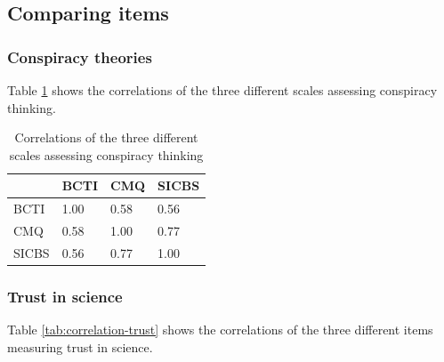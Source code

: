 \documentclass[
  doc,floatsintext]{apa6}
\begin{document}
\subsection{Comparing items}\label{comparing-items}

\subsubsection{Conspiracy theories}\label{conspiracy-theories}

Table \ref{tab:correlation-conspiracy} shows the correlations of the three different scales assessing conspiracy thinking.

\begin{table}[h]

\begin{center}
\begin{threeparttable}

\caption{\label{tab:correlation-conspiracy}Correlations of the three different scales assessing conspiracy thinking}

\begin{tabular}{llll}
\toprule
 & \multicolumn{1}{c}{BCTI} & \multicolumn{1}{c}{CMQ} & \multicolumn{1}{c}{SICBS}\\
\midrule
BCTI & 1.00 & 0.58 & 0.56\\
CMQ & 0.58 & 1.00 & 0.77\\
SICBS & 0.56 & 0.77 & 1.00\\
\bottomrule
\end{tabular}

\end{threeparttable}
\end{center}

\end{table}

\subsubsection{Trust in science}\label{trust-in-science-3}

Table \ref{tab:correlation-trust} shows the correlations of the three different items measuring trust in science.
\end{document}

